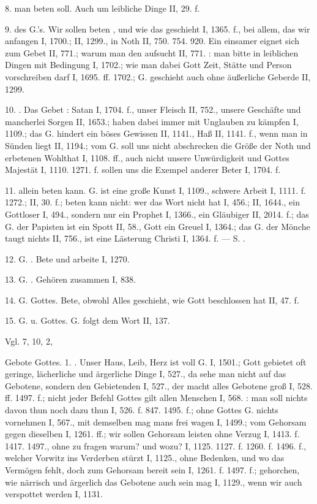 8.  man beten soll. Auch um leibliche Dinge II, 29. f.

9.  des G.’s. Wir sollen beten , und wie das geschieht I, 1365. f., bei allem, das wir anfangen I, 1700.; II, 1299., in Noth II, 750. 754. 920. Ein einsamer  eignet sich zum Gebet II, 771.; warum man den aufsucht II, 771. : man bitte in leiblichen Dingen mit Bedingung I, 1702.; wie man dabei Gott Zeit, Stätte und Person vorschreiben darf I, 1695. ff. 1702.; G. geschieht auch ohne äußerliche Geberde II, 1299.

10. . Das Gebet : Satan I, 1704. f., unser Fleisch II, 752., unsere Geschäfte und mancherlei Sorgen II, 1653.; haben dabei immer mit Unglauben zu kämpfen I, 1109.; das G. hindert ein böses Gewissen II, 1141., Haß II, 1141. f., wenn man in Sünden liegt II, 1194.; vom G. soll uns nicht abschrecken die Größe der Noth und erbetenen Wohlthat I, 1108. ff., auch nicht unsere Unwürdigkeit und Gottes Majestät I, 1110. 1271. f.  sollen uns die Exempel anderer Beter I, 1704. f.

11.  allein beten kann. G. ist eine große Kunst I, 1109., schwere Arbeit I, 1111. f. 1272.; II, 30. f.; beten kann nicht: wer das Wort nicht hat I, 456.; II, 1644., ein Gottloser I, 494., sondern nur ein Prophet I, 1366., ein Gläubiger II, 2014. f.; das G. der Papisten ist ein Spott II, 58., Gott ein Greuel I, 1364.; das G. der Mönche taugt nichts II, 756., ist eine Lästerung Christi I, 1364. f. — S. .

12. G. . Bete und arbeite I, 1270.

13. G. . Gehören zusammen I, 838.

14. G.  Gottes. Bete, obwohl Alles geschieht, wie Gott beschlossen hat II, 47. f.

15. G. u.  Gottes. G. folgt dem Wort II, 137.

Vgl.  7,  10,  2, 

Gebote Gottes. 1. . Unser Haus, Leib, Herz ist voll G. I, 1501.; Gott gebietet oft geringe, lächerliche und ärgerliche Dinge I, 527., da sehe man nicht auf das Gebotene, sondern den Gebietenden I, 527., der macht alles Gebotene groß I, 528. ff. 1497. f.; nicht jeder Befehl Gottes gilt allen Menschen I, 568. : man soll nichts davon thun noch dazu thun I, 526. f. 847. 1495. f.; ohne Gottes G. nichts vornehmen I, 567., mit demselben mag mans frei wagen I, 1499.; vom Gehorsam gegen dieselben I, 1261. ff.; wir sollen Gehorsam leisten ohne Verzug I, 1413. f. 1417. 1497., ohne zu fragen warum? und wozu? I, 1125. 1127. f. 1260. f. 1496. f., welcher Vorwitz ins Verderben stürzt I, 1125., ohne Bedenken, und wo das Vermögen fehlt, doch zum Gehorsam bereit sein I, 1261. f. 1497. f.; gehorchen, wie närrisch und ärgerlich das Gebotene auch sein mag I, 1129., wenn wir auch verspottet werden I, 1131.

